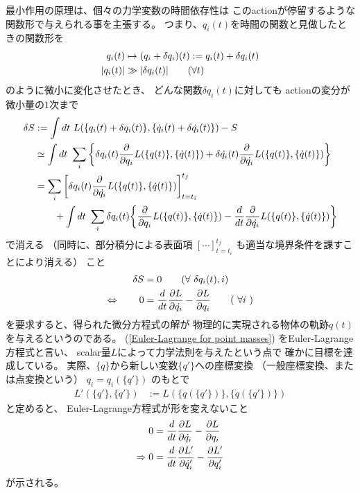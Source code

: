最小作用の原理は、個々の力学変数の時間依存性は
このactionが停留するような関数形で与えられる事を主張する。
つまり、$q_i(t)$を時間の関数と見做したときの関数形を
\begin{align}
  q_i(t) &\mapsto (q_i+\delta q_i)(t) := q_i(t) + \delta q_i(t)
  \\
  | q_i(t) | & \gg | \delta q_i(t) |
  \qquad (\forall t)
\notag
\end{align}
のように微小に変化させたとき、
どんな関数$\delta q_i(t)$に対しても
actionの変分が微小量の$1$次まで
\begin{align}
  \delta S &:= \int dt\ L(\{ q_i(t) + \delta q_i(t) \},
  \{ \dot{q}_i(t) + \delta \dot{q_i}(t) \} )
  - S
\notag\\&\simeq
  \int dt\ \sum_i
  \bigg\{
    \delta q_i(t)
    \dfrac{\partial}{\partial q_i}
    L(\{ q(t) \},
    \{ \dot{q}(t) \} )
+
    \delta \dot{q_i}(t)
    \dfrac{\partial}{\partial \dot{q_i}}
    L(\{ q(t) \},
    \{ \dot{q}(t) \} )
  \bigg\}
\notag\\&=
  \sum_i
  \bigg[
    \delta q_i(t)
    \dfrac{\partial}{\partial \dot{q_i}}
    L(\{ q(t) \},
    \{ \dot{q}(t) \} )
  \bigg]_{t=t_i}^{t_f}
\notag\\&\qquad
  +
\int dt\ \sum_i
\delta q_i(t)
\bigg\{
  \dfrac{\partial}{\partial q_i}
  L(\{ q(t) \},
  \{ \dot{q}(t) \} )
-
  \dfrac{d}{dt}
  \dfrac{\partial}{\partial \dot{q_i}}
  L(\{ q(t) \},
  \{ \dot{q}(t) \} )
\bigg\}
\label{variation of action}
\end{align}
で消える
（同時に、部分積分による表面項
$[\cdots]_{t=t_i}^{t_f}$
も適当な境界条件を課すことにより消える）
こと
\begin{align}
  \delta S &= 0
  \qquad (\forall\ \delta q_i(t), i)
\notag\\\Leftrightarrow\qquad
  0 &=
  \dfrac{d}{dt}\dfrac{\partial L}{\partial \dot{q_i} }
  - \dfrac{\partial L}{\partial q_i }
  \qquad (\ \forall i\ )
\label{Euler-Lagrange for point masses}
\end{align}
を要求すると、得られた微分方程式の解が
物理的に実現される物体の軌跡${q(t)}$
を与えるというのである。
(\ref{Euler-Lagrange for point masses})
をEuler-Lagrange方程式と言い、
scalar量$L$によって力学法則を与えたという点で
確かに目標を達成している。
実際、$\{q\}$から新しい変数$\{ q'\}$への座標変換
（一般座標変換、または点変換という）
$q_i = q_i(\{q'\})$
のもとで
\begin{align}
  L'(\{q'\}, \{\dot{q}'\}) &:= L(\{q(\{q'\})\}, \{\dot{q}(\{q'\})\})
\end{align}
と定めると、
Euler-Lagrange方程式が形を変えないこと
\begin{align}
  0 &=
  \dfrac{d}{dt}\dfrac{\partial L}{\partial \dot{q_i} }
  - \dfrac{\partial L}{\partial q_i }
\notag\\\Rightarrow
0 &=
\dfrac{d}{dt}\dfrac{\partial L'}{\partial \dot{q}'_i }
- \dfrac{\partial L'}{\partial q_i' }
\label{point transformation}
\end{align}
が示される。

